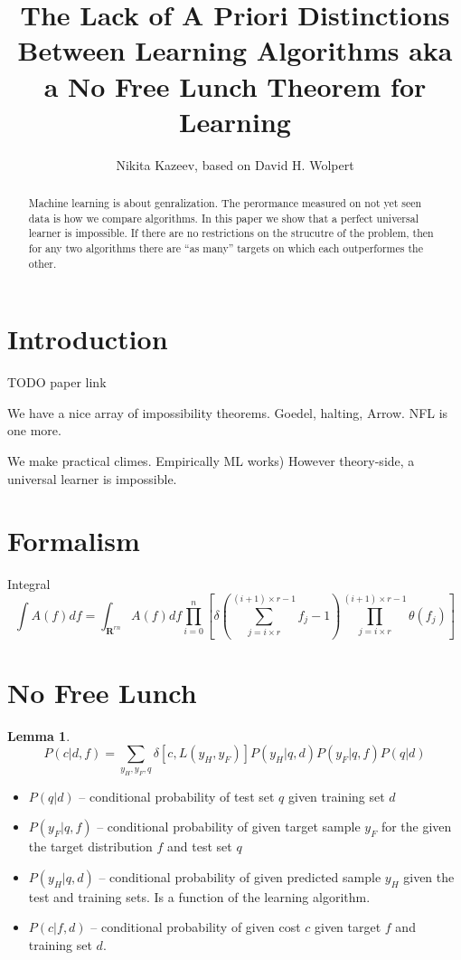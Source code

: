 \documentclass[a4paper]{article}
\title{The Lack of A Priori Distinctions Between Learning Algorithms aka
a No Free Lunch Theorem for Learning}
\author{Nikita Kazeev, based on David H. Wolpert}
\newtheorem{lemma}{Lemma}
\begin{document}
\maketitle
\begin{abstract}
  Machine learning is about genralization. The perormance measured on
  not yet seen data is how we compare algorithms. In this paper we
  show that a perfect universal learner is impossible. If there are no
  restrictions on the strucutre of the problem, then for any two
  algorithms there are ``as many'' targets on which each outperformes
  the other.
\end{abstract}
\section{Introduction}

TODO paper link

We have a nice array of impossibility theorems. Goedel, halting,
Arrow. NFL is one more. 

We  make practical climes. Empirically ML works) However
theory-side, a universal learner is impossible.

\section{Formalism}
\printglossaries

Integral
\begin{equation}
  \int A(f) df = \int_{\mathbf{R}^{rn}} A(f) df \prod_{i=0}^n\left[\delta\left(\sum_{j=i\times r}^{(i+1)\times r-1}f_j - 1\right) \prod_{j=i\times r}^{(i+1)\times r-1}\theta\left(f_j\right)  \right]
\end{equation}

\section{No Free Lunch}
\begin{lemma}
\begin{equation}
  P(c|d,f) = \sum_{y_H,y_F,q}\delta\left[c,L\left(y_H, y_F\right)\right] P\left(y_H|q, d\right)
  P\left(y_F| q, f\right)P\left(q|d\right)
  \label{lm:Pcdf}
\end{equation}
\end{lemma}

\begin{itemize}
\item $P\left(q|d\right)$ -- conditional probability of test set $q$ given training set $d$
\item $P\left(y_F| q, f\right)$ -- conditional probability of given
  target sample $y_F$ for the given the target distribution $f$ and
  test set $q$
\item $P\left(y_H|q, d\right)$ -- conditional probability of given
  predicted sample $y_H$ given the test and training sets. Is a
  function of the learning algorithm.
\item $P(c|f,d)$ -- conditional probability of given cost $c$ given
  target $f$ and training set $d$.
\end{itemize}
\end{document}
